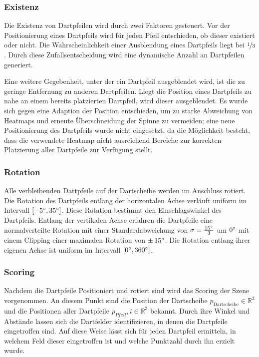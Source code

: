 \subsubsection{Existenz}

Die Existenz von Dartpfeilen wird durch zwei Faktoren gesteuert. Vor der Positionierung eines Dartpfeils wird für jeden Pfeil entschieden, ob dieser existiert oder nicht. Die Wahrscheinlichkeit einer Ausblendung eines Dartpfeils liegt bei $\nicefrac{1}{3}$. Durch diese Zufallsentscheidung wird eine dynamische Anzahl an Dartpfeilen generiert.

Eine weitere Gegebenheit, unter der ein Dartpfeil ausgeblendet wird, ist die zu geringe Entfernung zu anderen Dartpfeilen. Liegt die Position eines Dartpfeils zu nahe an einem bereits platzierten Dartpfeil, wird dieser ausgeblendet. Es wurde sich gegen eine Adaption der Position entschieden, um zu starke Abweichung von Heatmaps und erneute Überschneidung der Spinne zu vermeiden; eine neue Positionierung des Dartpfeils wurde nicht eingesetzt, da die Möglichkeit besteht, dass die verwendete Heatmap nicht ausreichend Bereiche zur korrekten Platzierung aller Dartpfeile zur Verfügung stellt.

\subsubsection{Rotation}

Alle verbleibenden Dartpfeile auf der Dartscheibe werden im Anschluss rotiert. Die Rotation des Dartpfeils entlang der horizontalen Achse verläuft uniform im Intervall $[-5^{\circ}, 35^{\circ}]$. Diese Rotation bestimmt den Einschlagswinkel des Dartpfeils. Entlang der vertikalen Achse erfahren die Dartpfeile eine normalverteilte Rotation mit einer Standardabweichung von $\sigma = \frac{15^{\circ}}{3}$ um $0^{\circ}$ mit einem Clipping einer maximalen Rotation von $\pm\,15^{\circ}$. Die Rotation entlang ihrer eigenen Achse ist uniform im Intervall $[0^{\circ}, 360^{\circ}]$.

\subsubsection{Scoring}

Nachdem die Dartpfeile Positioniert und rotiert sind wird das Scoring der Szene vorgenommen. An diesem Punkt sind die Position der Dartscheibe $p_\text{Dartscheibe} \in \mathbb{R}^3$ und die Positionen aller Dartpfeile $p_{Pfeil}, i \in \mathbb{R}^3$ bekannt. Durch ihre Winkel und Abstände lassen sich die Dartfelder identifizieren, in denen die Dartpfeile eingetroffen sind. Auf diese Weise lässt sich für jeden Dartpfeil ermitteln, in welchem Feld dieser eingetroffen ist und welche Punktzahl durch ihn erzielt wurde.

